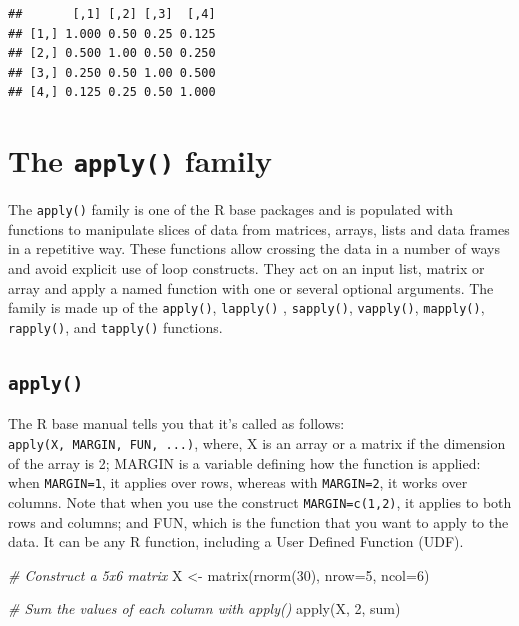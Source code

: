 \documentclass[
]{book}
\newenvironment{Shaded}{\begin{snugshade}}{\end{snugshade}}
\newcommand{\AttributeTok}[1]{\textcolor[rgb]{0.77,0.63,0.00}{#1}}
\newcommand{\CommentTok}[1]{\textcolor[rgb]{0.56,0.35,0.01}{\textit{#1}}}
\newcommand{\DecValTok}[1]{\textcolor[rgb]{0.00,0.00,0.81}{#1}}
\newcommand{\FunctionTok}[1]{\textcolor[rgb]{0.00,0.00,0.00}{#1}}
\newcommand{\NormalTok}[1]{#1}
\newcommand{\OtherTok}[1]{\textcolor[rgb]{0.56,0.35,0.01}{#1}}
\begin{document}
\begin{verbatim}
##       [,1] [,2] [,3]  [,4]
## [1,] 1.000 0.50 0.25 0.125
## [2,] 0.500 1.00 0.50 0.250
## [3,] 0.250 0.50 1.00 0.500
## [4,] 0.125 0.25 0.50 1.000
\end{verbatim}

\hypertarget{the-apply-family}{%
\section{\texorpdfstring{The \texttt{apply()} family}{The apply() family}}\label{the-apply-family}}

The \texttt{apply()} family is one of the R base packages and is populated with functions to manipulate slices of data from matrices, arrays, lists and data frames in a repetitive way. These functions allow crossing the data in a number of ways and avoid explicit use of loop constructs. They act on an input list, matrix or array and apply a named function with one or several optional arguments. The family is made up of the \texttt{apply()}, \texttt{lapply()} , \texttt{sapply()}, \texttt{vapply()}, \texttt{mapply()}, \texttt{rapply()}, and \texttt{tapply()} functions.

\hypertarget{apply}{%
\subsection{\texorpdfstring{\texttt{apply()}}{apply()}}\label{apply}}

The R base manual tells you that it's called as follows: \texttt{apply(X,\ MARGIN,\ FUN,\ ...)}, where, X is an array or a matrix if the dimension of the array is 2; MARGIN is a variable defining how the function is applied: when \texttt{MARGIN=1}, it applies over rows, whereas with \texttt{MARGIN=2}, it works over columns. Note that when you use the construct \texttt{MARGIN=c(1,2)}, it applies to both rows and columns; and FUN, which is the function that you want to apply to the data. It can be any R function, including a User Defined Function (UDF).

\begin{Shaded}
\begin{Highlighting}[]
\CommentTok{\# Construct a 5x6 matrix}
\NormalTok{X }\OtherTok{\textless{}{-}} \FunctionTok{matrix}\NormalTok{(}\FunctionTok{rnorm}\NormalTok{(}\DecValTok{30}\NormalTok{), }\AttributeTok{nrow=}\DecValTok{5}\NormalTok{, }\AttributeTok{ncol=}\DecValTok{6}\NormalTok{)}

\CommentTok{\# Sum the values of each column with \textasciigrave{}apply()\textasciigrave{}}
\FunctionTok{apply}\NormalTok{(X, }\DecValTok{2}\NormalTok{, sum)}
\end{Highlighting}
\end{Shaded}
\end{document}
